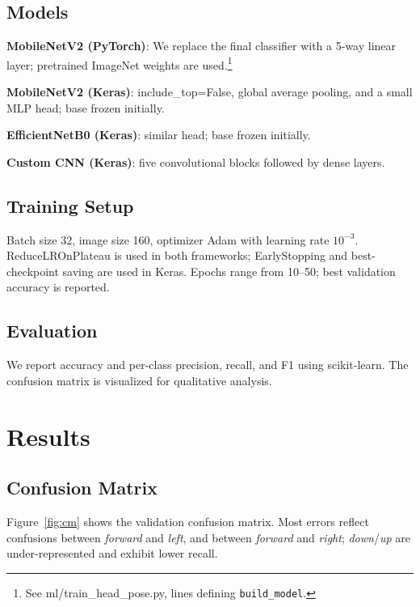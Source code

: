 \documentclass[11pt]{article}
\begin{document}
\subsection{Models}
\textbf{MobileNetV2 (PyTorch)}: We replace the final classifier with a 5-way linear layer; pretrained ImageNet weights are used.\footnote{See ml/train\_head\_pose.py, lines defining \texttt{build\_model}.}

\textbf{MobileNetV2 (Keras)}: include\_top=False, global average pooling, and a small MLP head; base frozen initially.

\textbf{EfficientNetB0 (Keras)}: similar head; base frozen initially.

\textbf{Custom CNN (Keras)}: five convolutional blocks followed by dense layers.

\subsection{Training Setup}
Batch size 32, image size 160, optimizer Adam with learning rate $10^{-3}$. ReduceLROnPlateau is used in both frameworks; EarlyStopping and best-checkpoint saving are used in Keras. Epochs range from 10--50; best validation accuracy is reported.

\subsection{Evaluation}
We report accuracy and per-class precision, recall, and F1 using scikit-learn. The confusion matrix is visualized for qualitative analysis.

\section{Results}
\subsection{Confusion Matrix}
Figure~\ref{fig:cm} shows the validation confusion matrix. Most errors reflect confusions between \emph{forward} and \emph{left}, and between \emph{forward} and \emph{right}; \emph{down}/\emph{up} are under-represented and exhibit lower recall.
\end{document}
